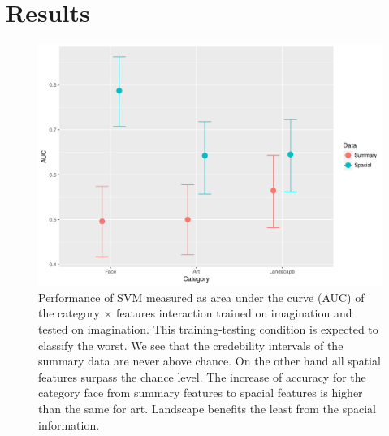 \documentclass[a4paper,man,natbib,floatsintext]{apa6}
\begin{document}
\section{Results}

\begin{figure}
\centering
\includegraphics[width=1\textwidth]{CategoryXFeature.pdf}
\caption[Category $\times$ Features]{\label{fig:CategoryXFeature} Performance of SVM measured as area under the curve (AUC) of the category $\times$ features interaction trained on imagination and tested on imagination. This training-testing condition is expected to classify the worst. We see that the credebility intervals of the summary data are never above chance. On the other hand all spatial features surpass the chance level. The increase of accuracy for the category face from summary features to spacial features is higher than the same for art. Landscape benefits the least from the spacial information. }
\end{figure}
\end{document}
